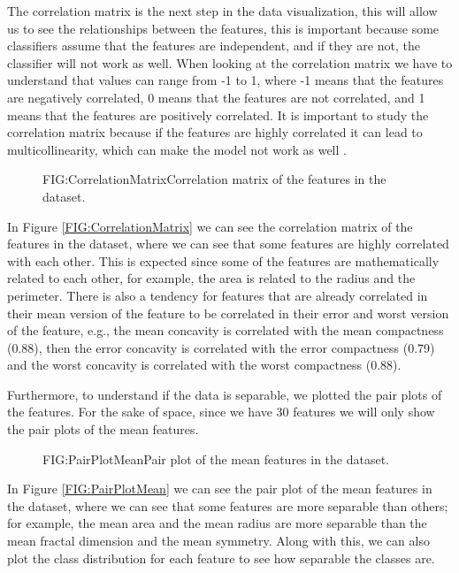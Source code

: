 The correlation matrix is the next step in the data visualization, this will allow us to see the relationships between the features, this is important because some classifiers assume that the features are independent, and if they are not, the classifier will not work as well. When looking at the correlation matrix we have to understand that values can range from -1 to 1, where -1 means that the features are negatively correlated, 0 means that the features are not correlated, and 1 means that the features are positively correlated. It is important to study the correlation matrix because if the features are highly correlated it can lead to multicollinearity, which can make the model not work as well \cite{belsley_regression_2005}.

\begin{figure}[Correlation Matrix]{FIG:CorrelationMatrix}{Correlation matrix of the features in the dataset.}
\end{figure}

In Figure \ref{FIG:CorrelationMatrix} we can see the correlation matrix of the features in the dataset, where we can see that some features are highly correlated with each other. This is expected since some of the features are mathematically related to each other, for example, the area is related to the radius and the perimeter. There is also a tendency for features that are already correlated in their mean version of the feature to be correlated in their error and worst version of the feature, e.g., the mean concavity is correlated with the mean compactness (0.88), then the error concavity is correlated with the error compactness (0.79) and the worst concavity is correlated with the worst compactness (0.88).

Furthermore, to understand if the data is separable, we plotted the pair plots of the features. For the sake of space, since we have 30 features we will only show the pair plots of the mean features.

\begin{figure}[Pair Plot of the Mean Features]{FIG:PairPlotMean}{Pair plot of the mean features in the dataset.}

\end{figure}

In Figure \ref{FIG:PairPlotMean} we can see the pair plot of the mean features in the dataset, where we can see that some features are more separable than others; for example, the mean area and the mean radius are more separable than the mean fractal dimension and the mean symmetry. Along with this, we can also plot the class distribution for each feature to see how separable the classes are. 

